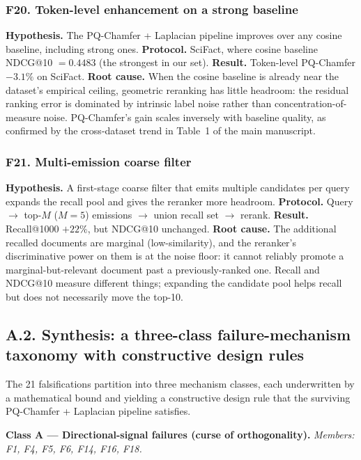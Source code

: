 \documentclass[review,1p,11pt]{elsarticle}
\begin{document}
\subsubsection*{F20. Token-level enhancement on a strong baseline}
\textbf{Hypothesis.} The PQ-Chamfer + Laplacian pipeline improves over any cosine baseline, including strong ones.
\textbf{Protocol.} SciFact, where cosine baseline NDCG@10 $= 0.4483$ (the strongest in our set).
\textbf{Result.} Token-level PQ-Chamfer $-3.1\%$ on SciFact.
\textbf{Root cause.} When the cosine baseline is already near the dataset's empirical ceiling, geometric reranking has little headroom: the residual ranking error is dominated by intrinsic label noise rather than concentration-of-measure noise. PQ-Chamfer's gain scales inversely with baseline quality, as confirmed by the cross-dataset trend in Table~1 of the main manuscript.

\subsubsection*{F21. Multi-emission coarse filter}
\textbf{Hypothesis.} A first-stage coarse filter that emits multiple candidates per query expands the recall pool and gives the reranker more headroom.
\textbf{Protocol.} Query $\to$ top-$M$ ($M=5$) emissions $\to$ union recall set $\to$ rerank.
\textbf{Result.} Recall@1000 $+22\%$, but NDCG@10 unchanged.
\textbf{Root cause.} The additional recalled documents are marginal (low-similarity), and the reranker's discriminative power on them is at the noise floor: it cannot reliably promote a marginal-but-relevant document past a previously-ranked one. Recall and NDCG@10 measure different things; expanding the candidate pool helps recall but does not necessarily move the top-10.

\subsection*{A.2. Synthesis: a three-class failure-mechanism taxonomy with constructive design rules}
\label{subsec:falsification-taxonomy-supp}

The 21 falsifications partition into three mechanism classes, each underwritten by a mathematical bound and yielding a constructive design rule that the surviving PQ-Chamfer + Laplacian pipeline satisfies.

\textbf{Class A --- Directional-signal failures (curse of orthogonality).} \emph{Members: F1, F4, F5, F6, F14, F16, F18.}
\end{document}

